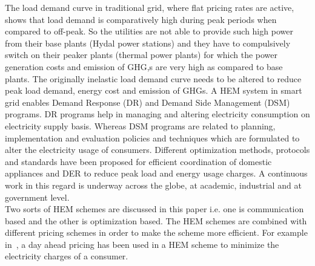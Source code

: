\documentclass[journal]{IEEEtran}
\begin{document}
\indent The load demand curve in traditional grid, where flat pricing rates are active, shows that load demand is comparatively high during peak periods when compared to off-peak. So the utilities are not able to provide such high power from their base plants (Hydal power stations) and they have to compulsively switch on their peaker plants (thermal power plants) for which the power generation costs and emission of GHG,s are very high as compared to base plants. The originally inelastic load demand curve needs to be altered to reduce peak load demand, energy cost and emission of GHGs. A HEM system in smart grid enables Demand Response (DR) and Demand Side Management (DSM) programs. DR programs help in managing and altering electricity consumption on electricity supply basis. Whereas DSM programs are related to planning, implementation and evaluation policies and techniques which are formulated to alter the electricity usage of consumers. Different optimization methods, protocols and standards have been proposed for efficient coordination of domestic appliances and DER to reduce peak load and energy usage charges. A continuous work in this regard is underway across the globe, at academic, industrial and at government level.\\
\indent Two sorts of HEM schemes are discussed in this paper i.e. one is communication based and the other is optimization based. The HEM schemes are combined with different pricing schemes in order to make the scheme more efficient. For example in~\cite{baig2013smart}, a day ahead pricing has been used in a HEM scheme to minimize the electricity charges of a consumer.\\



\hfill
\end{document}

